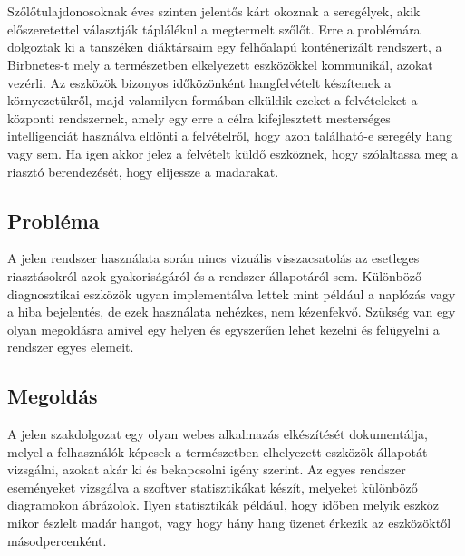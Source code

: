 \chapter{\bevezetes}
Szőlőtulajdonosoknak éves szinten jelentős kárt okoznak a seregélyek, akik előszeretettel választják táplálékul a megtermelt szőlőt.
Erre a problémára dolgoztak ki a tanszéken diáktársaim egy felhőalapú konténerizált rendszert, a Birbnetes-t
mely a természetben elkelyezett eszközökkel kommunikál, azokat vezérli.
Az eszközök bizonyos időközönként hangfelvételt készítenek a környezetükről,
majd valamilyen formában elküldik ezeket a felvételeket a központi rendszernek,
amely egy erre a célra kifejlesztett mesterséges intelligenciát használva eldönti
a felvételről, hogy azon található-e seregély hang vagy sem.
Ha igen akkor jelez a felvételt küldő eszköznek, hogy szólaltassa meg a riasztó
berendezését, hogy elijessze a madarakat.

\section{Probléma}
A jelen rendszer használata során nincs vizuális visszacsatolás az esetleges riasztásokról azok gyakoriságáról
és a rendszer állapotáról sem. Különböző diagnosztikai eszközök ugyan implementálva lettek mint például
a naplózás vagy a hiba bejelentés, de ezek használata nehézkes, nem kézenfekvő. 
Szükség van egy olyan megoldásra amivel egy helyen és egyszerűen lehet kezelni és felügyelni a rendszer egyes elemeit.

\section{Megoldás}
A jelen szakdolgozat egy olyan webes alkalmazás elkészítését dokumentálja, melyel a felhasználók képesek
a természetben elhelyezett eszközök állapotát vizsgálni, azokat akár ki és bekapcsolni igény szerint.
Az egyes rendszer eseményeket vizsgálva a szoftver statisztikákat készít, melyeket különböző diagramokon ábrázolok.
Ilyen statisztikák például, hogy időben melyik eszköz mikor észlelt madár hangot, vagy hogy hány hang üzenet érkezik
az eszközöktől másodpercenként.

